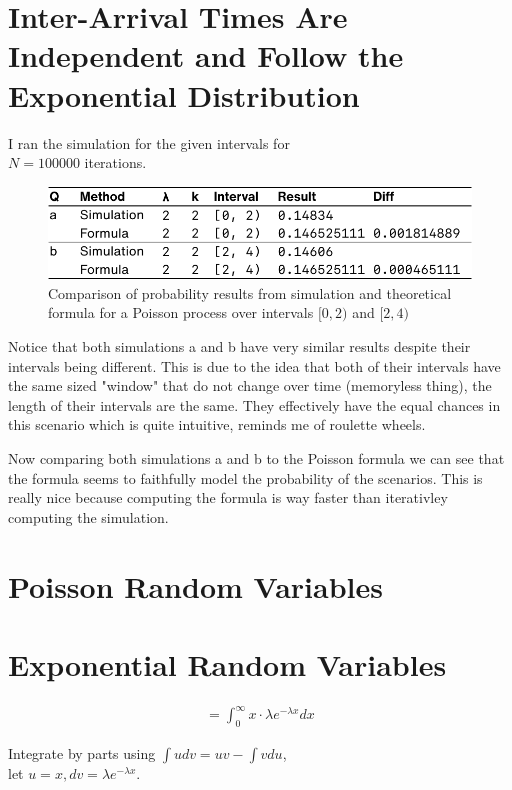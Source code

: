 \documentclass[twocolumn]{article}
\begin{document}
\section{Inter-Arrival Times Are Independent and Follow the Exponential Distribution}
I ran the simulation for the given intervals for \\$N=100000$ iterations. 
\begin{figure}[H]
	\centering
	\includegraphics[width=1\linewidth]{../drawings/p2}
	\caption{Comparison of probability results from simulation and theoretical formula for a Poisson process over intervals $[0,2)$ and $[2,4)$}
\end{figure}

Notice that both simulations a and b have very similar results despite their intervals being different. This is due to the idea that both of their intervals have the same sized "window" that do not change over time (memoryless thing), the length of their intervals are the same. They effectively have the equal chances in this scenario which is quite intuitive, reminds me of roulette wheels.

Now comparing both simulations a and b to the Poisson formula we can see that the formula seems to faithfully model the probability of the scenarios. This is really nice because computing the formula is way faster than iterativley computing the simulation.


\section{Poisson Random Variables}
\section{Exponential Random Variables}

\vspace{-5pt}

\begin{align*}
	= \int_{0}^{\infty} x \cdot \lambda e^{-\lambda x} dx
\end{align*}

Integrate by parts using $\int udv  = uv - \int vdu$, \\let $u = x, dv=\lambda e^{-\lambda x}$.
\end{document}
